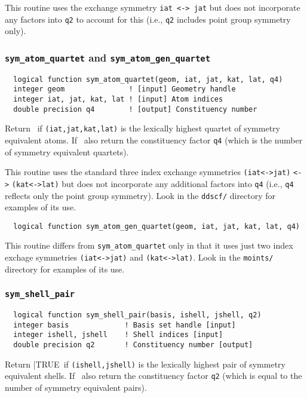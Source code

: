 This routine uses the exchange symmetry \verb+iat <-> jat+ but does
not incorporate any factors into \verb+q2+ to account for this (i.e.,
\verb+q2+ includes point group symmetry only).

\subsubsection{{\tt sym\_atom\_quartet} and {\tt sym\_atom\_gen\_quartet}}
\begin{verbatim}
  logical function sym_atom_quartet(geom, iat, jat, kat, lat, q4)
  integer geom               ! [input] Geometry handle
  integer iat, jat, kat, lat ! [input] Atom indices
  double precision q4        ! [output] Constituency number
\end{verbatim}
Return \TRUE\ if \verb+(iat,jat,kat,lat)+ is the lexically highest
quartet of symmetry equivalent atoms. If \TRUE\ also return the
constituency factor \verb+q4+ (which is the number of symmetry
equivalent quartets).

This routine uses the standard three index exchange symmetries
\verb+(iat<->jat)+ \verb+<->+ \verb+(kat<->lat)+ but does not
incorporate any additional factors into \verb+q4+ (i.e., \verb+q4+
reflects only the point group symmetry).  Look in the \verb+ddscf/+
directory for examples of its use.

\begin{verbatim}
  logical function sym_atom_gen_quartet(geom, iat, jat, kat, lat, q4)
\end{verbatim}
This routine differs from \verb+sym_atom_quartet+ only in that it
uses just two index exchage symmetries \verb+(iat<->jat)+ and
\verb+(kat<->lat)+.  Look in the \verb+moints/+ directory for examples
of its use.

\subsubsection{{\tt sym\_shell\_pair}}
\begin{verbatim}
  logical function sym_shell_pair(basis, ishell, jshell, q2)
  integer basis             ! Basis set handle [input]
  integer ishell, jshell    ! Shell indices [input]
  double precision q2       ! Constituency number [output]
\end{verbatim}
Return |TRUE\ if \verb+(ishell,jshell)+ is the lexically highest pair
of symmetry equivalent shells. If \TRUE\, also return the constituency
factor \verb+q2+ (which is equal to the number of symmetry equivalent
pairs).

